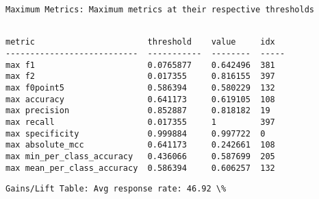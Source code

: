 \documentclass[11pt]{article}
\begin{document}
    
    \begin{Verbatim}[commandchars=\\\{\}]
Maximum Metrics: Maximum metrics at their respective thresholds


    \end{Verbatim}

    
    \begin{verbatim}
metric                       threshold    value     idx
---------------------------  -----------  --------  -----
max f1                       0.0765877    0.642496  381
max f2                       0.017355     0.816155  397
max f0point5                 0.586394     0.580229  132
max accuracy                 0.641173     0.619105  108
max precision                0.852887     0.818182  19
max recall                   0.017355     1         397
max specificity              0.999884     0.997722  0
max absolute_mcc             0.641173     0.242661  108
max min_per_class_accuracy   0.436066     0.587699  205
max mean_per_class_accuracy  0.586394     0.606257  132
    \end{verbatim}

    
    \begin{Verbatim}[commandchars=\\\{\}]
Gains/Lift Table: Avg response rate: 46.92 \%


    \end{Verbatim}
\end{document}
